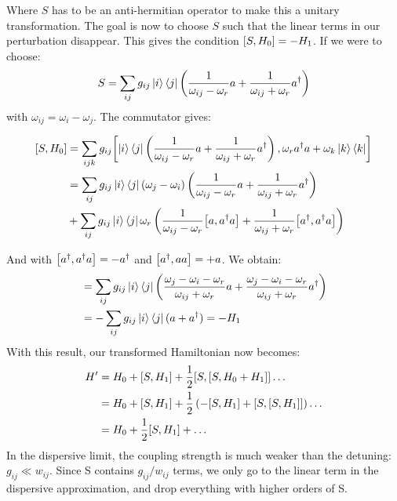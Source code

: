Where $S$ has to be an anti-hermitian operator to make this a unitary transformation. The goal is now to choose $S$ such that the linear terms in our perturbation disappear. This gives the condition $\comm{S}{H_0} = - H_1$. If we were to choose:
\begin{equation}
    S = \sum_{ij}g_{ij}\ket{i}\bra{j}\left(\frac{1}{\omega_{ij} - \omega_r}a + \frac{1}{\omega_{ij} + \omega_r} a^\dagger \right)
\end{equation}
with $\omega_{ij} = \omega_i - \omega_j$. The commutator gives:
\begin{fullwidth}
\begin{align*}
    \comm{S}{H_0} &= \sum_{ijk}g_{ij}\comm{\ket{i}\bra{j}\left(\frac{1}{\omega_{ij} - \omega_r}a + \frac{1}{\omega_{ij} + \omega_r} a^\dagger \right)}{\omega_r a^\dagger a + \omega_k \ket{k}\bra{k}} \\
    &= \sum_{ij} g_{ij}\ket{i}\bra{j} (\omega_j - \omega_i) \left(\frac{1}{\omega_{ij} - \omega_r}a + \frac{1}{\omega_{ij} + \omega_r} a^\dagger\right) \\
    &+ \sum_{ij} g_{ij} \ket{i}\bra{j} \omega_r \left(\frac{1}{\omega_{ij} - \omega_r} \comm{a}{a^\dagger a}  + \frac{1}{\omega_{ij} + \omega_r} \comm{a^\dagger}{a^\dagger a} \right) 
\end{align*}
\end{fullwidth}
And with $\comm{a^\dagger}{a^\dagger a} = - a^\dagger$ and $\comm{a^\dagger}{a a} = + a$. We obtain:
\begin{align*}
    &= \sum_{ij}g_{ij}\ket{i}\bra{j}\left(\frac{\omega_j - \omega_i - \omega_r}{\omega_{ij} + \omega_r} a + \frac{\omega_j - \omega_i - \omega_r}{\omega_{ij} + \omega_r} a^\dagger  \right) \\
    &= -\sum_{ij}g_{ij}\ket{i}\bra{j}(a + a^\dagger) = - H_1
\end{align*}
With this result, our transformed Hamiltonian now becomes:
\begin{align}
    H' &= H_0 + \comm{S}{H_1} + \frac12\comm{S}{\comm{S}{H_0 + H_1}} \dots \nonumber \\
       &= H_0 + \comm{S}{H_1} + \frac12\left( - \comm{S}{H_1} + \comm{S}{\comm{S}{H_1}}\right) \dots \\
       &= H_0 + \frac12\comm{S}{H_1} + \dots
\end{align}
In the dispersive limit, the coupling strength is much weaker than the detuning: $g_{ij} \ll w_{ij}$. Since S contains $g_{ij} / w_{ij}$ terms, we only go to the linear term in the dispersive approximation, and drop everything with higher orders of S. 

